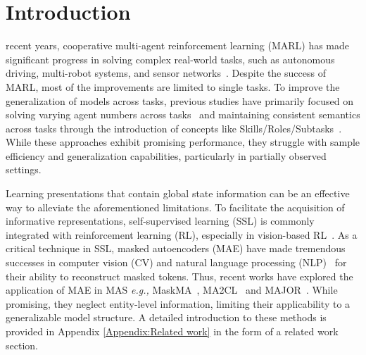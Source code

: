 \section{Introduction}

 recent years, cooperative multi-agent reinforcement learning (MARL) has made significant progress in solving complex real-world tasks, such as autonomous driving, multi-robot systems, and sensor networks~\cite{xiao2023stochastic,wu2022deep,feng2024efficient,yun2022cooperative,okine2024multi,galvan2021neuroevolution}. Despite the success of MARL, most of the improvements are limited to single tasks. To improve the generalization of models across tasks, previous studies have primarily focused on solving varying agent numbers across tasks~\cite{hu2021updet,wang2022multi,xu2023improving,liu2023masked} and maintaining consistent semantics across tasks through the introduction of concepts like Skills/Roles/Subtasks~\cite{Decompose_Tian,zhang2022discovering}. 
While these approaches exhibit promising performance, they struggle with sample efficiency and generalization capabilities, particularly in partially observed settings.

Learning presentations that contain global state information can be an effective way to alleviate the aforementioned limitations. To facilitate the acquisition of informative representations, self-supervised learning (SSL) is commonly integrated with reinforcement learning (RL), especially in vision-based RL~\cite{laskin2020curl,zhu2022masked,yu2022mask,liu2022masked,kang2023sample,zhao2023learning,nguyen2021csnas}. As a critical technique in SSL, masked autoencoders (MAE) have made tremendous successes in computer vision (CV) and natural language processing (NLP)~\cite{devlin2018bert,he2022masked,brown2020language} for their ability to reconstruct masked tokens. Thus, recent works have explored the application of MAE in MAS \textit{e.g.,} MaskMA~\cite{liu2023masked}, MA2CL~\cite{song2023ma2cl} and MAJOR~\cite{feng2022joint}. While promising, they neglect entity-level information, limiting their applicability to a generalizable model structure. A detailed introduction to these methods is provided in Appendix \ref{Appendix:Related work} in the form of a related work section.

